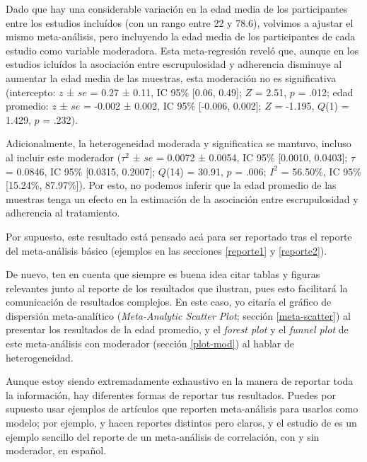 \documentclass[
  bookmarksnumbered]{article}
\begin{document}
\begin{tcolorbox}[enhanced,attach boxed title to top center={yshift=-3mm,yshifttext=-1mm},
  colback=iacol!5!white,colframe=iacol!75!white,colbacktitle=iacol,
  title=Ejemplo de reporte con moderador continuo,fonttitle=\bfseries, parbox=false,
  boxed title style={size=small,colframe=iacol} ]
  
Dado que hay una considerable variación en la edad media de los participantes entre los estudios incluídos (con un rango entre 22 y 78.6), volvimos a ajustar el mismo meta-análisis, pero incluyendo la edad media de los participantes de cada estudio como variable moderadora. Esta meta-regresión reveló que, aunque en los estudios icluídos la asociación entre escrupulosidad y adherencia disminuye al aumentar la edad media de las muestras, esta moderación no es significativa (intercepto: $z$ ± $se$ = 0.27 ± 0.11, IC 95\% [0.06, 0.49]; $Z$ = 2.51, $p$ = .012; edad promedio: $z$ ± $se$ = -0.002 ± 0.002, IC 95\% [-0.006, 0.002]; $Z$ = -1.195, $Q$(1) = 1.429,   $p$ = .232). 

Adicionalmente, la heterogeneidad moderada y significatica se mantuvo, incluso al incluir este moderador ($\tau^2$ ± $se$ =  0.0072 ± 0.0054, IC 95\% [0.0010, 0.0403]; $\tau$ = 0.0846, IC 95\% [0.0315, 0.2007]; $Q$(14) =  30.91, $p$ = .006; $I^2$ = 56.50\%, IC 95\% [15.24\%, 87.97\%]). Por esto, no podemos inferir que la edad promedio de las muestras tenga un efecto en la estimación de la asociación entre escrupulosidad y adherencia al tratamiento.  

\end{tcolorbox}

Por supuesto, este resultado está pensado acá para ser reportado tras el reporte del meta-análisis básico (ejemplos en las secciones \ref{reporte1} y \ref{reporte2}).

De nuevo, ten en cuenta que siempre es buena idea citar tablas y figuras relevantes junto al reporte de los resultados que ilustran, pues esto facilitará la comunicación de resultados complejos. En este caso, yo citaría el gráfico de dispersión meta-analítico (\emph{Meta-Analytic Scatter Plot}; sección \ref{meta-scatter}) al presentar los resultados de la edad promedio, y el \emph{forest plot} y el \emph{funnel plot} de este meta-análisis con moderador (sección \ref{plot-mod}) al hablar de heterogeneidad.

Aunque estoy siendo extremadamente exhaustivo en la manera de reportar toda la información, hay diferentes formas de reportar tus resultados. Puedes por supuesto usar ejemplos de artículos que reporten meta-análisis para usarlos como modelo; por ejemplo, \textcite{salsmanMetaanalyticApproachExamining2015} y \textcite{shiCorrelationAdherenceRates2010} hacen reportes distintos pero claros, y el estudio de \textcite{hidalgo-fuentesUsoProblematicoInternet2022} es un ejemplo sencillo del reporte de un meta-análisis de correlación, con y sin moderador, en español.
\end{document}
